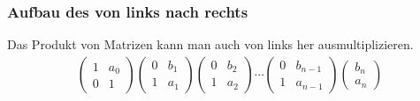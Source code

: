 \subsubsection {Aufbau des von links nach rechts}
Das Produkt von Matrizen kann man auch von links her ausmultiplizieren.
\begin{align*}
		\begin{pmatrix}
			1& a_0\\
			0& 1
		\end{pmatrix}
		\begin{pmatrix}
			0& b_1\\
			1& a_1
		\end{pmatrix}
		\begin{pmatrix}
			0& b_2\\
			1& a_2
		\end{pmatrix}
		\cdots
		\begin{pmatrix}
			0& b_{n-1}\\
			1& a_{n-1}
		\end{pmatrix}
		\begin{pmatrix}
			b_n\\
			a_n
		\end{pmatrix}
\end{align*}
